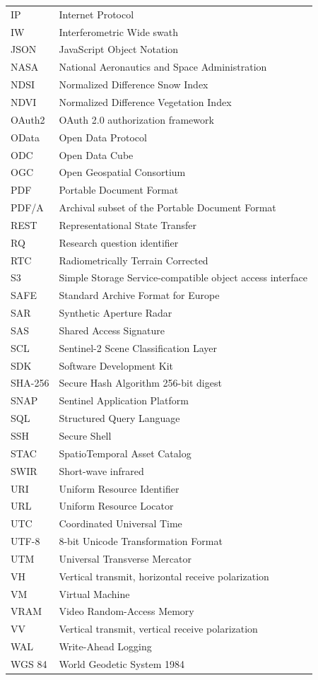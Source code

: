 \begin{longtable}{p{}p{}}
IP & Internet Protocol \\
IW & Interferometric Wide swath \\
JSON & JavaScript Object Notation \\
NASA & National Aeronautics and Space Administration \\
NDSI & Normalized Difference Snow Index \\
NDVI & Normalized Difference Vegetation Index \\
OAuth2 & OAuth 2.0 authorization framework \\
OData & Open Data Protocol \\
ODC & Open Data Cube \\
OGC & Open Geospatial Consortium \\
PDF & Portable Document Format \\
PDF/A & Archival subset of the Portable Document Format \\
REST & Representational State Transfer \\
RQ & Research question identifier \\
RTC & Radiometrically Terrain Corrected \\
S3 & Simple Storage Service-compatible object access interface \\
SAFE & Standard Archive Format for Europe \\
SAR & Synthetic Aperture Radar \\
SAS & Shared Access Signature \\
SCL & Sentinel-2 Scene Classification Layer \\
SDK & Software Development Kit \\
SHA-256 & Secure Hash Algorithm 256-bit digest \\
SNAP & Sentinel Application Platform \\
SQL & Structured Query Language \\
SSH & Secure Shell \\
STAC & SpatioTemporal Asset Catalog \\
SWIR & Short-wave infrared \\
URI & Uniform Resource Identifier \\
URL & Uniform Resource Locator \\
UTC & Coordinated Universal Time \\
UTF-8 & 8-bit Unicode Transformation Format \\
UTM & Universal Transverse Mercator \\
VH & Vertical transmit, horizontal receive polarization \\
VM & Virtual Machine \\
VRAM & Video Random-Access Memory \\
VV & Vertical transmit, vertical receive polarization \\
WAL & Write-Ahead Logging \\
WGS 84 & World Geodetic System 1984 \\
\bottomrule
\end{longtable}
\normalsize
